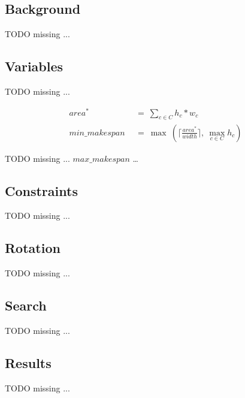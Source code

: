 
\subsection{Background}
    \colorbox{BurntOrange}{TODO missing ...}


\subsection{Variables}
    \colorbox{BurntOrange}{TODO missing ...}

    \begin{align*}
        area^*\       &\ =\ \sum_{c \in C} h_c * w_c \\
        min\_makespan\ &\ =\ \max\ (\lceil \frac{area^*}{width} \rceil,\ \max_{c \in C} h_c)
    \end{align*}

    \colorbox{BurntOrange}{TODO missing ...}
    \(max\_makespan\) \ldots
    


\subsection{Constraints}
    \colorbox{BurntOrange}{TODO missing ...}


\subsection{Rotation}
    \colorbox{BurntOrange}{TODO missing ...}


\subsection{Search}
    \colorbox{BurntOrange}{TODO missing ...}


\subsection{Results}
    \colorbox{BurntOrange}{TODO missing ...}

